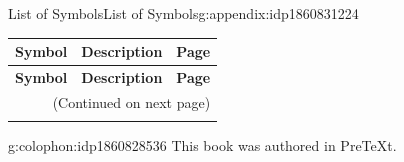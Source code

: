 \documentclass[twoside,10pt,]{book}
\newcommand{\xreffont}{\relax}
\numberwithin{equation}{chapter}
\providecommand\phantomsection{}
\begin{document}
\typeout{************************************************}
%
\begin{appendixptx}{List of Symbols}{}{List of Symbols}{}{}{g:appendix:idp1860831224}
\begin{longtable}[l]{lp{}r}
\addtocounter{table}{-1}
\textbf{Symbol}&\textbf{Description}&\textbf{Page}\\[1em]
\endfirsthead
\textbf{Symbol}&\textbf{Description}&\textbf{Page}\\[1em]
\endhead
\multicolumn{3}{r}{(Continued on next page)}\\
\endfoot
\endlastfoot
\end{longtable}
\end{appendixptx}
%
\backmatter%
%
\clearpage\phantomsection%
%
%
{\xreffont\printindex}
%
\cleardoublepage
\pagestyle{empty}
\begin{backcolophon}{g:colophon:idp1860828536}%
This book was authored in PreTeXt.%
\end{backcolophon}%
\end{document}
